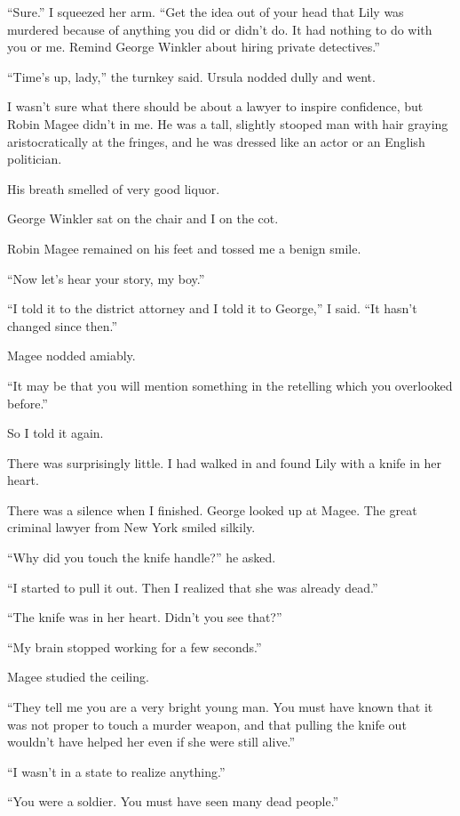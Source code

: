 \documentclass{novel}
\begin{document}
“Sure.” I squeezed her arm. “Get the idea out of your head that Lily was murdered because of anything you did or didn’t do. It had nothing to do with you or me. Remind George Winkler about hiring private detectives.”

“Time’s up, lady,” the turnkey said. Ursula nodded dully and went.

\scenestars

I wasn’t sure what there should be about a lawyer to inspire confidence, but Robin Magee didn’t in me. He was a tall, slightly stooped man with hair graying aristocratically at the fringes, and he was dressed like an actor or an English politician.

His breath smelled of very good liquor.

George Winkler sat on the chair and I on the cot.

Robin Magee remained on his feet and tossed me a benign smile.

“Now let’s hear your story, my boy.”

“I told it to the district attorney and I told it to George,” I said. “It hasn’t changed since then.”

Magee nodded amiably. 

“It may be that you will mention something in the retelling which you overlooked before.”

So I told it again. 

There was surprisingly little. I had walked in and found Lily with a knife in her heart.

There was a silence when I finished. George looked up at Magee. The great criminal lawyer from New York smiled silkily.

“Why did you touch the knife handle?” he asked.

“I started to pull it out. Then I realized that she was already dead.”

“The knife was in her heart. Didn’t you see that?”

“My brain stopped working for a few seconds.”

Magee studied the ceiling.

“They tell me you are a very bright young man. You must have known that it was not proper to touch a murder weapon, and that pulling the knife out wouldn’t have helped her even if she were still alive.”

“I wasn’t in a state to realize anything.”

“You were a soldier. You must have seen many dead people.”
\end{document}
